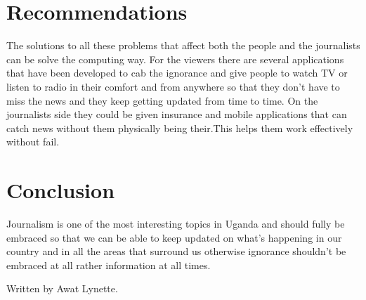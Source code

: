 \documentclass[12pt,]{article}
\begin{document}
 
 
\section{Recommendations}
 The  solutions to all these problems that affect both the people and the journalists can be solve the computing way. 
For the viewers there are several applications that have been developed to cab the ignorance and give people to watch TV or listen to radio in their comfort and from anywhere so that they don't have to miss the news and they keep getting updated from time to time.
 On the journalists side they could be given insurance and mobile applications that can catch news without them physically being their.This helps them work effectively without fail.
 
\section{Conclusion}
Journalism is one of the most interesting topics in Uganda and should fully be embraced so that we can be able to keep updated on what's happening in our country and in all the areas that surround us otherwise ignorance shouldn't be embraced at all rather information at all times.



         Written by Awat Lynette.
\end{document}
